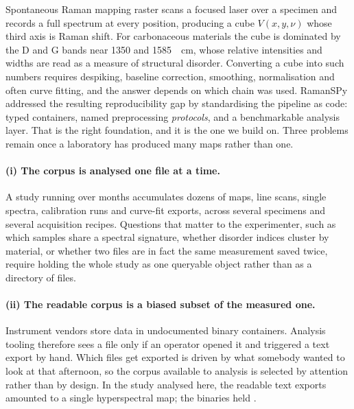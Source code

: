 
Spontaneous Raman mapping raster scans a focused laser over a specimen and
records a full spectrum at every position, producing a cube $V(x,y,\nu)$ whose
third axis is Raman shift. For carbonaceous materials the cube is dominated by
the D and G bands near \SI{1350}{} and \SI{1585}{\per\centi\metre}, whose
relative intensities and widths are read as a measure of structural disorder.
Converting a cube into such numbers requires despiking, baseline correction,
smoothing, normalisation and often curve fitting, and the answer depends on
which chain was used. RamanSPy
\cite{georgiev2024ramanspy,georgiev2023ramanspy_preprint} addressed the
resulting reproducibility gap by standardising the pipeline as code: typed
containers, named preprocessing \emph{protocols}, and a benchmarkable analysis
layer. That is the right foundation, and it is the one we build on. Three
problems remain once a laboratory has produced many maps rather than one.

\paragraph{(i) The corpus is analysed one file at a time.}
A study running over months accumulates dozens of maps, line scans, single
spectra, calibration runs and curve-fit exports, across several specimens and
several acquisition recipes. Questions that matter to the experimenter, such as
which samples share a spectral signature, whether disorder indices cluster by
material, or whether two files are in fact the same measurement saved twice,
require holding the whole study as one queryable object rather than as a
directory of files.

\paragraph{(ii) The readable corpus is a biased subset of the measured one.}
Instrument vendors store data in undocumented binary containers. Analysis
tooling therefore sees a file only if an operator opened it and triggered a
text export by hand. Which files get exported is driven by what somebody
wanted to look at that afternoon, so the corpus available to analysis is
selected by attention rather than by design. In the study analysed here, the
readable text exports amounted to a single hyperspectral map; the binaries held
\Nrawmap{}.

